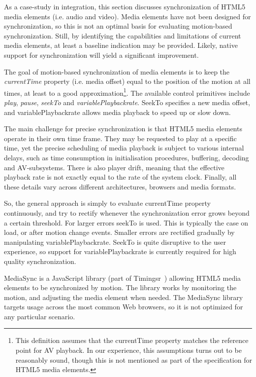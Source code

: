 As a case-study in integration, this section discusses synchronization of
HTML5 media elements (i.e. audio and video). Media elements have not been
designed for synchronization, so this is not an optimal basis for evaluating
motion-based synchronization. Still, by identifying the capabilities and
limitations of current media elements, at least a baseline indication may be
provided. Likely, native support for synchronization will yield a significant
improvement.

The goal of motion-based synchronization of media elements is to keep the
\emph{currentTime} property (i.e. media offset) equal to the position of the
motion at all times, at least to a good approximation\footnote{This definition
assumes that the currentTime property matches the reference point for AV
playback. In our experience, this assumptions turns out to be reasonably
sound, though this is not mentioned as part of the specification for HTML5
media elements. }. The available control primitives include \emph{play},
\emph{pause}, \emph{seekTo} and \emph{variablePlaybackrate}. SeekTo specifies
a new media offset, and variablePlaybackrate allows media playback to speed up
or slow down.

The main challenge for precise synchronization is that HTML5 media elements
operate in their own time frame. They may be requested to play at a specific
time, yet the precise scheduling of media playback is subject to various
internal delays, such as time consumption in initialisation procedures,
buffering, decoding and AV-subsystems. There is also player drift, meaning
that the effective playback rate is not exactly equal to the rate of the
system clock. Finally, all these details vary across different architectures,
browsers and media formats.

So, the general approach is simply to evaluate currentTime property
continuously, and try to rectify whenever the synchronization error grows
beyond a certain threshold. For larger errors seekTo is used. This is
typically the case on load, or after motion change events. Smaller errors are
rectified gradually by manipulating variablePlaybackrate. SeekTo is quite
disruptive to the user experience, so support for variablePlaybackrate is
currently required for high quality synchronization.


MediaSync is a JavaScript library (part of Timingsr~\cite{timingsrc}) allowing
HTML5 media elements to be synchronized by motion. The library works by
monitoring the motion, and adjusting the media element when needed. The
MediaSync library targets usage across the most common Web browsers, so it is
not optimized for any particular scenario.

